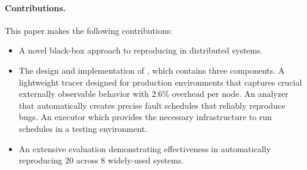 




 
\paragraph{Contributions.}
This paper makes the following contributions:
\begin{itemize}[leftmargin=*]
    \item A novel black-box approach to reproducing \efibshort in distributed systems.
    \item The design and implementation of \sys, which contains three components.
    A lightweight tracer designed for production environments that captures crucial externally observable behavior with 2.6\% overhead per node. 
    An analyzer that automatically creates precise fault schedules that reliably reproduce bugs.
    An executor which provides the necessary infrastructure to run schedules in a testing environment.
    \item An extensive evaluation demonstrating \sys effectiveness in automatically reproducing 20 \efibshort across 8 widely-used systems.
\end{itemize}
